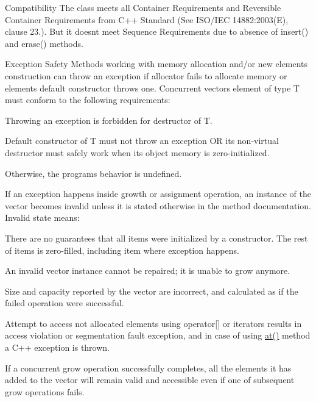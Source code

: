 \begin{DoxyParagraph}{Compatibility}
The class meets all Container Requirements and Reversible Container Requirements from C++ Standard (See I\+S\+O/\+I\+E\+C 14882\+:2003(E), clause 23.). But it doesn\textquotesingle{}t meet Sequence Requirements due to absence of insert() and erase() methods.
\end{DoxyParagraph}
\begin{DoxyParagraph}{Exception Safety}
Methods working with memory allocation and/or new elements construction can throw an exception if allocator fails to allocate memory or element\textquotesingle{}s default constructor throws one. Concurrent vector\textquotesingle{}s element of type T must conform to the following requirements\+:
\begin{DoxyItemize}
\item Throwing an exception is forbidden for destructor of T.
\item Default constructor of T must not throw an exception O\+R its non-\/virtual destructor must safely work when its object memory is zero-\/initialized.
\end{DoxyItemize}Otherwise, the program\textquotesingle{}s behavior is undefined. 
\end{DoxyParagraph}
\begin{DoxyParagraph}{}
If an exception happens inside growth or assignment operation, an instance of the vector becomes invalid unless it is stated otherwise in the method documentation. Invalid state means\+:
\begin{DoxyItemize}
\item There are no guarantees that all items were initialized by a constructor. The rest of items is zero-\/filled, including item where exception happens.
\item An invalid vector instance cannot be repaired; it is unable to grow anymore.
\item Size and capacity reported by the vector are incorrect, and calculated as if the failed operation were successful.
\item Attempt to access not allocated elements using operator\mbox{[}\mbox{]} or iterators results in access violation or segmentation fault exception, and in case of using \hyperlink{classtbb_1_1concurrent__vector_a0e47a4c0a8fe53465b7c4a744601a755}{at()} method a C++ exception is thrown.
\end{DoxyItemize}If a concurrent grow operation successfully completes, all the elements it has added to the vector will remain valid and accessible even if one of subsequent grow operations fails.
\end{DoxyParagraph}
